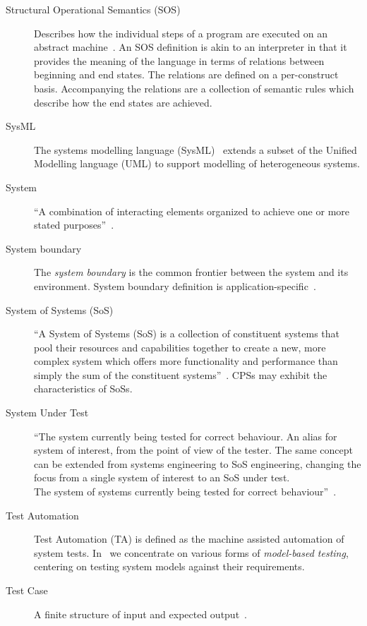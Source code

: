\begin{description}
\item[Structural Operational Semantics (SOS)] Describes how the individual steps of a program are executed on an abstract machine~\cite{Plotkin81}. An SOS definition is akin to an interpreter in that it provides the meaning of the language in terms of relations between beginning and end states. The relations are defined on a per-construct basis. Accompanying the relations are a collection of semantic rules which describe how the end states are achieved.

\item[SysML] The systems modelling language (SysML)~\cite{SysML12} extends a subset of the Unified Modelling language (UML) to support modelling of heterogeneous systems.

\item[System] ``A combination of interacting elements organized to achieve one or more stated purposes''~\cite{INCOSEseh15}.

\item[System boundary] The \emph{system boundary} is the common frontier between the system and its environment. System boundary definition is application-specific~\cite{Broenink&12b}.

\item[System of Systems (SoS)] ``A System of Systems (SoS) is a collection of constituent systems that pool their resources and capabilities together to create a new, more complex system which offers more functionality and performance than simply the sum of the constituent systems''~\cite{Holt&14}. CPSs may exhibit the characteristics of SoSs.

\item[System Under Test] ``The system currently being tested for correct behaviour. An alias for system of interest, from the point of view of the tester. The same concept can be extended from systems engineering to SoS engineering, changing the focus from a single system of interest to an SoS under test.\\
The system of systems currently being tested for correct behaviour''~\cite{Holt&14}.

\item[Test Automation] Test Automation (TA) is defined as the machine assisted automation of system tests. In \into\ we concentrate on various forms of \emph{model-based testing}, centering on testing system models against their requirements.

\item[Test Case] A finite structure of input and expected output~\cite{Utting&06}.


\end{description}
